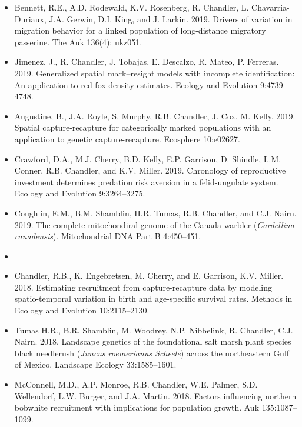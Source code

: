 \begin{itemize}
\item Bennett, R.E., A.D. Rodewald, K.V. Rosenberg, R. Chandler,
  L. Chavarria-Duriaux, J.A. Gerwin, D.I. King, and
  J. Larkin. 2019. Drivers of variation in migration behavior for a
  linked population of long-distance migratory passerine. The Auk
  136(4): ukz051.
  
\item Jimenez, J., R. Chandler, J. Tobajas, E. Descalzo, R. Mateo,
  P. Ferreras. 2019. Generalized spatial mark–resight models with
  incomplete identification: An application to red fox density
  estimates. Ecology and Evolution 9:4739--4748. 
  
\item Augustine, B., J.A. Royle, S. Murphy, R.B. Chandler,
  J. Cox, M. Kelly. 2019. Spatial capture-recapture for
  categorically marked populations with an application to genetic
  capture-recapture. Ecosphere 10:e02627.

\item Crawford, D.A., M.J. Cherry, B.D. Kelly, E.P. Garrison,
  D. Shindle, L.M. Conner, R.B. Chandler, and
  K.V. Miller. 2019. Chronology of reproductive investment determines
  predation risk aversion in a felid-ungulate system. Ecology and
  Evolution 9:3264--3275. 

\item Coughlin, E.M., B.M. Shamblin, H.R. Tumas, R.B. Chandler, and
  C.J. Nairn. 2019. The complete mitochondiral genome of the
  Canada warbler ({\it Cardellina canadensis}). Mitochondrial DNA Part
  B 4:450--451.

  
\item[] { \\}

\item Chandler, R.B., K. Engebretsen, M. Cherry, and E. Garrison, 
  K.V. Miller. 2018. Estimating recruitment from
  capture-recapture data by modeling spatio-temporal variation in
  birth and age-specific survival rates. Methods in Ecology and
  Evolution 10:2115--2130.

\item Tumas H.R., B.R. Shamblin, M. Woodrey, N.P. Nibbelink,
  R. Chandler, C.J. Nairn. 2018. Landscape genetics of the
  foundational salt marsh plant species black needlerush ({\it Juncus
    roemerianus Scheele}) across the northeastern Gulf of
  Mexico. Landscape Ecology 33:1585--1601.
  
\item McConnell, M.D., A.P. Monroe, R.B. Chandler, W.E. Palmer,
  S.D. Wellendorf, L.W. Burger, and J.A. Martin. 2018. Factors
  influencing northern bobwhite recruitment with implications for
  population growth. Auk 135:1087--1099.
  

\end{itemize}

